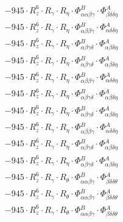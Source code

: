 \documentclass{article}
\begin{document}
\begin{subequations}
\begin{gather}
\begin{array}{c}
 \\[0.2em] 		 - 945 \cdot R_{z}^{6} \cdot R_{\gamma{}} \cdot R_{\eta{}} \cdot \Phi{}^{B}_{\alpha{}\alpha{}\beta{}\gamma{}} \cdot \Phi{}^{A}_{\beta{}\delta{}\delta{}\eta{}} 
 \\[0.2em] 		 - 945 \cdot R_{z}^{6} \cdot R_{\gamma{}} \cdot R_{\eta{}} \cdot \Phi{}^{B}_{\alpha{}\beta{}\beta{}\gamma{}} \cdot \Phi{}^{A}_{\alpha{}\delta{}\delta{}\eta{}} 
 \\[0.2em] 		 - 945 \cdot R_{z}^{6} \cdot R_{\gamma{}} \cdot R_{\eta{}} \cdot \Phi{}^{B}_{\alpha{}\beta{}\gamma{}\delta{}} \cdot \Phi{}^{A}_{\alpha{}\beta{}\delta{}\eta{}} 
 \\[0.2em] 		 - 945 \cdot R_{z}^{6} \cdot R_{\gamma{}} \cdot R_{\eta{}} \cdot \Phi{}^{B}_{\alpha{}\beta{}\gamma{}\delta{}} \cdot \Phi{}^{A}_{\alpha{}\beta{}\delta{}\eta{}} 
 \\[0.2em] 		 - 945 \cdot R_{z}^{6} \cdot R_{\gamma{}} \cdot R_{\eta{}} \cdot \Phi{}^{B}_{\alpha{}\beta{}\beta{}\gamma{}} \cdot \Phi{}^{A}_{\alpha{}\delta{}\delta{}\eta{}} 
 \\[0.2em] 		 - 945 \cdot R_{z}^{6} \cdot R_{\gamma{}} \cdot R_{\eta{}} \cdot \Phi{}^{B}_{\alpha{}\beta{}\gamma{}\delta{}} \cdot \Phi{}^{A}_{\alpha{}\beta{}\delta{}\eta{}} 
 \\[0.2em] 		 - 945 \cdot R_{z}^{6} \cdot R_{\gamma{}} \cdot R_{\eta{}} \cdot \Phi{}^{B}_{\alpha{}\beta{}\gamma{}\delta{}} \cdot \Phi{}^{A}_{\alpha{}\beta{}\delta{}\eta{}} 
 \\[0.2em] 		 - 945 \cdot R_{z}^{6} \cdot R_{\gamma{}} \cdot R_{\eta{}} \cdot \Phi{}^{B}_{\alpha{}\beta{}\beta{}\gamma{}} \cdot \Phi{}^{A}_{\alpha{}\delta{}\delta{}\eta{}} 
 \\[0.2em] 		 - 945 \cdot R_{z}^{6} \cdot R_{\gamma{}} \cdot R_{\eta{}} \cdot \Phi{}^{B}_{\alpha{}\beta{}\gamma{}\delta{}} \cdot \Phi{}^{A}_{\alpha{}\beta{}\delta{}\eta{}} 
 \\[0.2em] 		 - 945 \cdot R_{z}^{6} \cdot R_{\gamma{}} \cdot R_{\eta{}} \cdot \Phi{}^{B}_{\alpha{}\beta{}\gamma{}\delta{}} \cdot \Phi{}^{A}_{\alpha{}\beta{}\delta{}\eta{}} 
 \\[0.2em] 		 - 945 \cdot R_{z}^{6} \cdot R_{\gamma{}} \cdot R_{\theta{}} \cdot \Phi{}^{B}_{\alpha{}\alpha{}\beta{}\gamma{}} \cdot \Phi{}^{A}_{\beta{}\delta{}\delta{}\theta{}} 
 \\[0.2em] 		 - 945 \cdot R_{z}^{6} \cdot R_{\gamma{}} \cdot R_{\theta{}} \cdot \Phi{}^{B}_{\alpha{}\alpha{}\beta{}\gamma{}} \cdot \Phi{}^{A}_{\beta{}\delta{}\delta{}\theta{}} 
 \\[0.2em] 		 - 945 \cdot R_{z}^{6} \cdot R_{\gamma{}} \cdot R_{\theta{}} \cdot \Phi{}^{B}_{\alpha{}\alpha{}\beta{}\gamma{}} \cdot \Phi{}^{A}_{\beta{}\delta{}\delta{}\theta{}} 

\end{array}
\end{gather}
\end{subequations}
\end{document}
